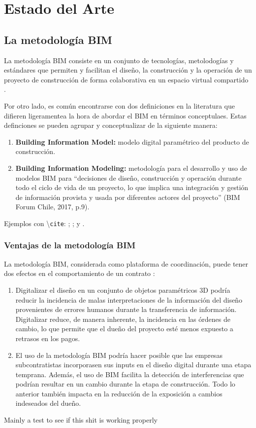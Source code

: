 \chapter{Estado del Arte}

\section{La metodología BIM}

La metodología BIM consiste en un conjunto de tecnologías, metolodogías y estándares que permiten y facilitan el diseño, la construcción y la operación de un proyecto de construcción de forma colaborativa en un espacio virtual compartido \cite{tabilo2019estudio}.

Por otro lado, es común encontrarse con dos definiciones en la literatura que difieren ligeramentea la hora de abordar el BIM en términos conceptulaes. Estas definciones se pueden agrupar y conceptualizar de la siguiente manera:

\begin{enumerate}
    \item \textbf{Building Information Model:} modelo digital paramétrico del producto de construcción.
    \item \textbf{Building Information Modeling:} metodología para el desarrollo y uso de modelos BIM para ``decisiones de diseño, construcción y operación durante todo el ciclo de vida de un proyecto, lo que implica una integración y gestión de información provista y usada por diferentes actores del proyecto” (BIM Forum Chile, 2017, p.9).
\end{enumerate}


Ejemplos con \textbackslash \texttt{cite}: ; \cite{lu2014cost};  y .

\subsection{Ventajas de la metodología BIM}

La metodología BIM, considerada como plataforma de coordinación, puede tener dos efectos en el comportamiento de un contrato \cite{chang2014economic}: 
\begin{enumerate}
    \item Digitalizar el diseño en un conjunto de objetos paramétricos 3D podría reducir la incidencia de malas interpretaciones de la información del diseño provenientes de errores humanos durante la transferencia de información. Digitalizar reduce, de manera inherente, la incidencia en las órdenes de cambio, lo que permite que el dueño del proyecto esté menos expuesto a retrasos en los pagos.
    \item El uso de la metodología BIM podría hacer posible que las empresas subcontratistas incorporasen sus inputs en el diseño digital durante una etapa temprana. Además, el uso de BIM facilita la detección de interferencias que podrían resultar en un cambio durante la etapa de construcción. Todo lo anterior también impacta en la reducción de la exposición a cambios indeseados del dueño.
\end{enumerate}


Mainly a test to see if this shit is working properly